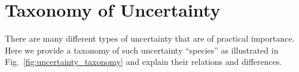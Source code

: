 

%

 \section{Taxonomy of Uncertainty}
There are many different types of uncertainty that are of practical importance. Here we provide a taxonomy of such uncertainty ``species'' as illustrated in Fig.~\ref{fig:uncertainty_taxonomy} and explain their relations and differences. 

